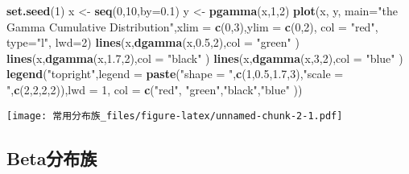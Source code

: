 \documentclass[]{article}
\newenvironment{Shaded}{\begin{snugshade}}{\end{snugshade}}
\newcommand{\DataTypeTok}[1]{\textcolor[rgb]{0.13,0.29,0.53}{#1}}
\newcommand{\DecValTok}[1]{\textcolor[rgb]{0.00,0.00,0.81}{#1}}
\newcommand{\FloatTok}[1]{\textcolor[rgb]{0.00,0.00,0.81}{#1}}
\newcommand{\KeywordTok}[1]{\textcolor[rgb]{0.13,0.29,0.53}{\textbf{#1}}}
\newcommand{\NormalTok}[1]{#1}
\newcommand{\StringTok}[1]{\textcolor[rgb]{0.31,0.60,0.02}{#1}}
\begin{document}
\begin{Shaded}
\begin{Highlighting}[]
\KeywordTok{set.seed}\NormalTok{(}\DecValTok{1}\NormalTok{)}
\NormalTok{x <-}\StringTok{ }\KeywordTok{seq}\NormalTok{(}\DecValTok{0}\NormalTok{,}\DecValTok{10}\NormalTok{,}\DataTypeTok{by=}\FloatTok{0.1}\NormalTok{)}
\NormalTok{y <-}\StringTok{ }\KeywordTok{pgamma}\NormalTok{(x,}\DecValTok{1}\NormalTok{,}\DecValTok{2}\NormalTok{)}
\KeywordTok{plot}\NormalTok{(x, y, }\DataTypeTok{main=}\StringTok{"the Gamma Cumulative Distribution"}\NormalTok{,}\DataTypeTok{xlim =} \KeywordTok{c}\NormalTok{(}\DecValTok{0}\NormalTok{,}\DecValTok{3}\NormalTok{),}\DataTypeTok{ylim =} \KeywordTok{c}\NormalTok{(}\DecValTok{0}\NormalTok{,}\DecValTok{2}\NormalTok{), }\DataTypeTok{col =} \StringTok{"red"}\NormalTok{, }\DataTypeTok{type=}\StringTok{"l"}\NormalTok{, }\DataTypeTok{lwd=}\DecValTok{2}\NormalTok{)}
\KeywordTok{lines}\NormalTok{(x,}\KeywordTok{dgamma}\NormalTok{(x,}\FloatTok{0.5}\NormalTok{,}\DecValTok{2}\NormalTok{),}\DataTypeTok{col =} \StringTok{"green"}\NormalTok{ )}
\KeywordTok{lines}\NormalTok{(x,}\KeywordTok{dgamma}\NormalTok{(x,}\FloatTok{1.7}\NormalTok{,}\DecValTok{2}\NormalTok{),}\DataTypeTok{col =} \StringTok{"black"}\NormalTok{ )}
\KeywordTok{lines}\NormalTok{(x,}\KeywordTok{dgamma}\NormalTok{(x,}\DecValTok{3}\NormalTok{,}\DecValTok{2}\NormalTok{),}\DataTypeTok{col =} \StringTok{"blue"}\NormalTok{ )}
\KeywordTok{legend}\NormalTok{(}\StringTok{"topright"}\NormalTok{,}\DataTypeTok{legend =} \KeywordTok{paste}\NormalTok{(}\StringTok{"shape = "}\NormalTok{,}\KeywordTok{c}\NormalTok{(}\DecValTok{1}\NormalTok{,}\FloatTok{0.5}\NormalTok{,}\FloatTok{1.7}\NormalTok{,}\DecValTok{3}\NormalTok{),}\StringTok{"scale = "}\NormalTok{,}\KeywordTok{c}\NormalTok{(}\DecValTok{2}\NormalTok{,}\DecValTok{2}\NormalTok{,}\DecValTok{2}\NormalTok{,}\DecValTok{2}\NormalTok{)),}\DataTypeTok{lwd =} \DecValTok{1}\NormalTok{, }\DataTypeTok{col =} \KeywordTok{c}\NormalTok{(}\StringTok{"red"}\NormalTok{, }\StringTok{"green"}\NormalTok{,}\StringTok{"black"}\NormalTok{,}\StringTok{"blue"}\NormalTok{ ))}
\end{Highlighting}
\end{Shaded}

\texttt{[image: 常用分布族\_files/figure-latex/unnamed-chunk-2-1.pdf]}

\hypertarget{beta}{%
\subsection{Beta分布族}\label{beta}}
\end{document}
